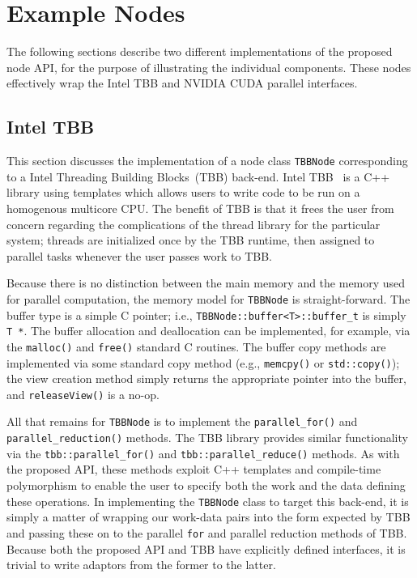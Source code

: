 \documentclass[10pt,conference,letterpaper]{IEEEtran}
\begin{document}
\section{Example Nodes}

The following sections describe two different implementations of the proposed node API, for the purpose of illustrating the individual components. These nodes effectively wrap the Intel TBB and NVIDIA CUDA parallel interfaces.

\subsection{Intel TBB}

This section discusses the implementation of a node class \verb!TBBNode! corresponding to a Intel Threading Building Blocks~(TBB) back-end. Intel TBB~\cite{TBB} is a C++ library using templates which allows users to write code to be run on a homogenous multicore CPU. The benefit of TBB is that it frees the user from concern regarding the complications of the thread library for the particular system; threads are initialized once by the TBB runtime, then assigned to parallel tasks whenever the user passes work to TBB.

Because there is no distinction between the main memory and the memory used for parallel computation, the memory model for \verb!TBBNode! is straight-forward. The buffer type is a simple C pointer; i.e., \verb!TBBNode::buffer<T>::buffer_t! is simply \verb!T *!. The buffer allocation and deallocation can be implemented, for example, via the \verb!malloc()! and \verb!free()! standard C routines. The buffer copy methods are implemented via some standard copy method (e.g., \verb!memcpy()! or \verb!std::copy()!); the view creation method simply returns the appropriate pointer into the buffer, and \verb!releaseView()! is a no-op.

All that remains for \verb!TBBNode! is to implement the \verb!parallel_for()! and \verb!parallel_reduction()! methods. The TBB library provides similar functionality via the \verb!tbb::parallel_for()! and \verb!tbb::parallel_reduce()! methods. As with the proposed API, these methods exploit C++ templates and compile-time polymorphism to enable the user to specify both the work and the data defining these operations. In implementing the \verb!TBBNode! class to target this back-end, it is simply a matter of wrapping our work-data pairs into the form expected by TBB and passing these on to the parallel \verb!for! and parallel reduction methods of TBB. Because both the proposed API and TBB have explicitly defined interfaces, it is trivial to write adaptors from the former to the latter.
\end{document}
